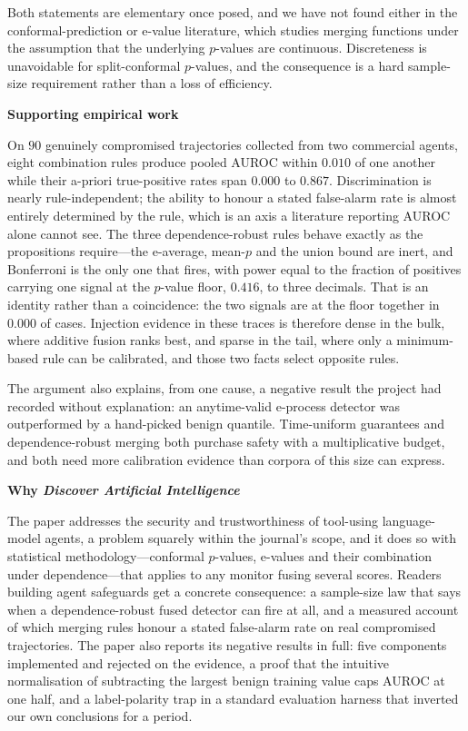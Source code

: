 \documentclass[10pt]{article}
\begin{document}
Both statements are elementary once posed, and we have not found either in the
conformal-prediction or e-value literature, which studies merging functions under
the assumption that the underlying $p$-values are continuous. Discreteness is
unavoidable for split-conformal $p$-values, and the consequence is a hard
sample-size requirement rather than a loss of efficiency.

\vspace{0.4em}
\noindent\textbf{Supporting empirical work}

\vspace{0.3em}
On $90$ genuinely compromised trajectories collected from two commercial agents,
eight combination rules produce pooled AUROC within $0.010$ of one another while
their a-priori true-positive rates span $0.000$ to $0.867$. Discrimination is
nearly rule-independent; the ability to honour a stated false-alarm rate is almost
entirely determined by the rule, which is an axis a literature reporting AUROC
alone cannot see. The three dependence-robust rules behave exactly as the
propositions require---the e-average, mean-$p$ and the union bound are inert, and
Bonferroni is the only one that fires, with power equal to the fraction of
positives carrying one signal at the $p$-value floor, $0.416$, to three decimals.
That is an identity rather than a coincidence: the two signals are at the floor
together in $0.000$ of cases. Injection evidence in these traces is therefore
dense in the bulk, where additive fusion ranks best, and sparse in the tail, where
only a minimum-based rule can be calibrated, and those two facts select opposite
rules.

The argument also explains, from one cause, a negative result the project had
recorded without explanation: an anytime-valid e-process detector was outperformed
by a hand-picked benign quantile. Time-uniform guarantees and dependence-robust
merging both purchase safety with a multiplicative budget, and both need more
calibration evidence than corpora of this size can express.

\vspace{0.4em}
\noindent\textbf{Why \emph{Discover Artificial Intelligence}}

\vspace{0.3em}
The paper addresses the security and trustworthiness of tool-using language-model
agents, a problem squarely within the journal's scope, and it does so with
statistical methodology---conformal $p$-values, e-values and their combination
under dependence---that applies to any monitor fusing several scores. Readers
building agent safeguards get a concrete consequence: a sample-size law that says
when a dependence-robust fused detector can fire at all, and a measured account of
which merging rules honour a stated false-alarm rate on real compromised
trajectories. The paper also reports its negative results in full: five
components implemented and rejected on the evidence, a proof that the intuitive
normalisation of subtracting the largest benign training value caps AUROC at one
half, and a label-polarity trap in a standard evaluation harness that inverted our
own conclusions for a period.
\end{document}
